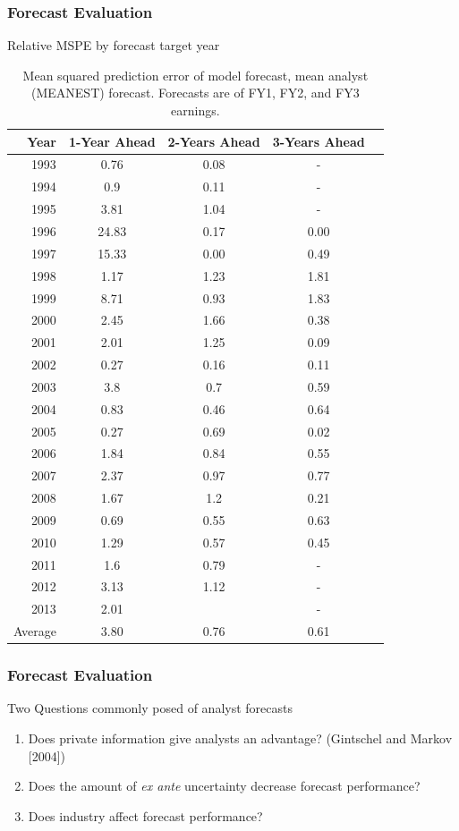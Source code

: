 \documentclass{beamer}
\newcommand\Fontvi{\fontsize{8}{7.2}\selectfont}
\begin{document}
\begin{frame}
\frametitle{Forecast Evaluation}
Relative MSPE by forecast target year

\begin{table}
\Fontvi
\centering
\begin{tabular}{rcccc}
  \hline
 Year & 1-Year Ahead & 2-Years Ahead & 3-Years Ahead \\ 
\hline
1993 & 0.76 & 0.08 & - \\ 
1994 & 0.9 & 0.11 & - \\ 
1995 & 3.81 & 1.04 & - \\ 
1996 & 24.83 & 0.17 & 0.00 \\ 
1997 & 15.33 & 0.00 & 0.49 \\ 
1998 & 1.17 & 1.23 & 1.81 \\ 
1999 & 8.71 & 0.93 & 1.83 \\ 
2000 & 2.45 & 1.66 & 0.38 \\ 
2001 & 2.01 & 1.25 & 0.09 \\ 
2002 & 0.27 & 0.16 & 0.11 \\ 
2003 & 3.8 & 0.7 & 0.59 \\ 
2004 & 0.83 & 0.46 & 0.64 \\ 
2005 & 0.27 & 0.69 & 0.02 \\ 
2006 & 1.84 & 0.84 & 0.55 \\ 
2007 & 2.37 & 0.97 & 0.77 \\ 
2008 & 1.67 & 1.2 & 0.21 \\ 
2009 & 0.69 & 0.55 & 0.63 \\ 
2010 & 1.29 & 0.57 & 0.45 \\ 
2011 & 1.6 & 0.79 & - \\ 
2012 & 3.13 & 1.12 & - \\ 
2013 & 2.01 &  & - \\ 
\hline
Average & 3.80 & 0.76 & 0.61 \\ 
\hline
\end{tabular}
\caption{Mean squared prediction error of model forecast, mean analyst (MEANEST) forecast. Forecasts are of FY1, FY2, and FY3 earnings.} 
\label{spe-by-year-table-fy1}
\end{table}

\end{frame}

\begin{frame}
\frametitle{Forecast Evaluation}
Two Questions commonly posed of analyst forecasts
\begin{enumerate}
\item Does private information give analysts an advantage? (Gintschel and Markov [2004])
\item Does the amount of \emph{ex ante} uncertainty decrease forecast performance? 
\item Does industry affect forecast performance? 
\end{enumerate}
\end{frame}
\end{document}
